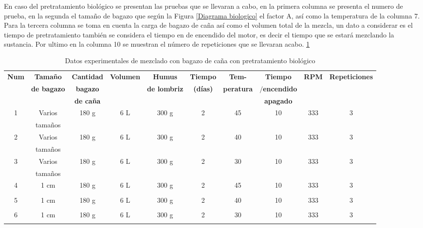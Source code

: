 \documentclass[12pt]{article}
\begin{document}
	En caso del pretratamiento biológico se presentan las pruebas que se llevaran a cabo, en la primera columna se presenta el numero de prueba, en la segunda el tamaño de bagazo que según la Figura \ref{Diagrama biologico} el factor A, así como la temperatura de la columna 7. Para la tercera columna se toma en cuenta la carga de bagazo de caña así como el volumen total de la mezcla, un dato a considerar es el tiempo de pretratamiento también se considera el tiempo en de encendido del motor, es decir el tiempo que se estará mezclando la sustancia. Por ultimo en la columna 10 se muestran el número de repeticiones que se llevaran acabo.   \ref{biologico2}
	
		\begin{table}[H]
		\centering
		\caption{Datos experimentales de mezclado con bagazo de caña con pretratamiento biológico}
		\label{biologico2}
		\resizebox{16cm}{!} {
			\begin{tabular}{|c|c|c|c|c|c|c|c|c| c| }
				\hline
				\textbf{Num} & \textbf{Tamaño } & \textbf{Cantidad } & \textbf{Volumen} & \textbf{Humus} & \textbf{Tiempo} & \textbf{Tem-} & \textbf{Tiempo} & \textbf{RPM} & \textbf{Repeticiones}\\
				& \textbf{ de bagazo} & \textbf{ bagazo} & & \textbf{de lombriz} & \textbf{(días)} & \textbf{peratura}&  \textbf{ $/$encendido}& &  \\
				
				& &  \textbf{ de caña} & &  &  &  &\textbf{ apagado} & & \\
				
				
				\hline
				1 & Varios & 180 g & 6 L & 300 g & 2 & 45 & 10 &  333 & 3 \\
				& tamaños & &  & &  &   &  & & \\	\hline
				
				
				2 & Varios & 180 g & 6 L & 300 g & 2 & 40 & 10 & 333 & 3 \\
				& tamaños & &  & &  &   &  & & \\	\hline
				
				
				3 & Varios & 180 g & 6 L & 300 g & 2 & 30 & 10 & 333& 3 \\
				& tamaños & &  & &  &   &  & & \\	\hline
				
				
				
				4 & 1 cm & 180 g & 6 L & 300 g & 2 & 45 & 10 &   333& 3 \\
				& & &  & &  &   &  & & \\	\hline
				
				
				5 & 1 cm & 180 g & 6 L & 300 g & 2 & 40 & 10 &  333 & 3 \\  
				& & &  & &  &   &  & & \\	\hline
				
				6 & 1 cm & 180 g & 6 L & 300 g & 2 & 30 & 10 &  333 & 3 \\  
				& & &  & &  &   &  & & \\	
				\hline
			\end{tabular}
		}
		
	\end{table}
	
\end{document}
